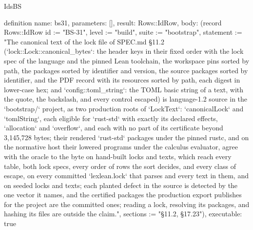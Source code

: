 \begin{lexlean}{IdsBS}
\begin{semanticmodule}
definition{
  name: bs31,
  parameters: [],
  result: Rows::IdRow,
  body: (record Rows::IdRow {id := "BS-31", level := "build", suite := "bootstrap", statement := "The canonical text of the lock file of SPEC.md §11.2 (`lock::Lock::canonical_bytes`: the header keys in their fixed order with the lock spec of the language and the pinned Lean toolchain, the workspace pins sorted by path, the packages sorted by identifier and version, the source packages sorted by identifier, and the PDF record with its resources sorted by path, each digest in lower-case hex; and `config::toml_string`: the TOML basic string of a text, with the quote, the backslash, and every control escaped) is language-1.2 source in the `bootstrap/` project, as two production roots of `LockText`: `canonicalLock` and `tomlString`, each eligible for `rust-std` with exactly its declared effects, `allocation` and `overflow`, and each with no part of its certificate beyond 3,145,728 bytes; their rendered `rust-std` packages under the pinned rustc, and on the normative host their lowered programs under the calculus evaluator, agree with the oracle to the byte on hand-built locks and texts, which reach every table, both lock specs, every order of rows the sort decides, and every class of escape, on every committed `lexlean.lock` that parses and every text in them, and on seeded locks and texts; each planted defect in the source is detected by the one vector it names, and the certified packages the production export publishes for the project are the committed ones; reading a lock, resolving its packages, and hashing its files are outside the claim.", sections := "§11.2, §17.23"}),
  executable: true
}


\end{semanticmodule}
\end{lexlean}
